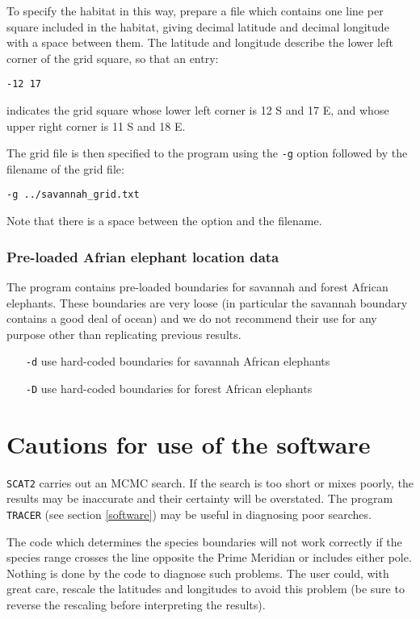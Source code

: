 \documentclass[10pt,titlepage,times,letterpaper]{article}
\def\SCAT{{\tt SCAT2} }
\begin{document}
To specify the habitat in this way, prepare a file which contains one line per
square included in the habitat, giving decimal latitude and decimal longitude with
a space between them.  The latitude and longitude describe the lower left corner of
the grid square, so that an entry:

{\tt -12 17}

indicates the grid square whose lower left corner is 12 S and 17 E, and whose upper right 
corner is 11 S and 18 E.

The grid file is then specified to the program using the {\tt -g} option followed
by the filename of the grid file:

{\tt -g ../savannah\_grid.txt}

Note that there is a space between the option and the filename.

\subsubsection{Pre-loaded Afrian elephant location data}

The program contains pre-loaded boundaries for savannah and forest 
African elephants.  These boundaries are very loose (in particular
the savannah boundary contains a good deal of ocean) and we do not
recommend their use for any purpose other than replicating previous
results.

\begin{itemize}
\item[{\tt -d}] use hard-coded boundaries for savannah African elephants
\item[{\tt -D}] use hard-coded boundaries for forest African elephants
\end{itemize}


\section{Cautions for use of the software}

\SCAT carries out an MCMC search.  If the search is too short or mixes
poorly, the results may be inaccurate and their certainty will be overstated.  The program
{\tt TRACER} (see section \ref{software}) may be useful in diagnosing poor
searches.

The code which determines the species boundaries
will not work correctly if the species range crosses the line opposite
the Prime Meridian or includes either pole.  Nothing is done by the code to
diagnose such problems.  The user could, with great 
care, rescale the latitudes and longitudes to avoid this problem (be sure 
to reverse the rescaling before interpreting the results). 
\end{document}
